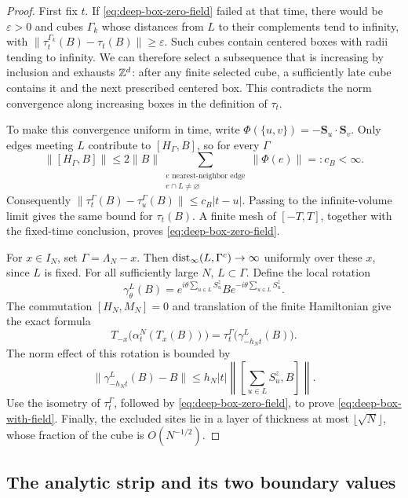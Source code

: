 \begin{proof}
First fix \(t\).  If \eqref{eq:deep-box-zero-field} failed at that
time, there would be \(\varepsilon>0\) and cubes \(\Gamma_k\)
whose distances from \(L\) to their complements tend to infinity,
with
\(\|\tau_t^{\Gamma_k}(B)-\tau_t(B)\|\geq\varepsilon\).
Such cubes contain centered boxes with radii tending to infinity.
We can therefore select a subsequence that is increasing by inclusion
and exhausts \(\mathbb Z^d\): after any finite selected cube, a sufficiently
late cube contains it and the next prescribed centered box.  This
contradicts the norm convergence along increasing boxes in the
definition of \(\tau_t\).

To make this convergence uniform in time, write
\(\Phi(\{u,v\})=-\mathbf S_u\cdot\mathbf S_v\).  Only edges meeting
\(L\) contribute to \([H_\Gamma,B]\), so for every \(\Gamma\)
\[
 \|[H_\Gamma,B]\|\leq
 2\|B\|\sum_{\substack{e\text{ nearest-neighbor edge}\\e\cap L\ne\varnothing}}
                   \|\Phi(e)\|=:c_B<\infty.
\]
Consequently
\(\|\tau_t^\Gamma(B)-\tau_u^\Gamma(B)\|\leq c_B|t-u|\).
Passing to the infinite-volume limit gives the same bound for
\(\tau_t(B)\).  A finite mesh of \([-T,T]\), together with the
fixed-time conclusion, proves \eqref{eq:deep-box-zero-field}.

For \(x\in I_N\), set \(\Gamma=\Lambda_N-x\).  Then
\(\operatorname{dist}_\infty(L,\Gamma^c)\to\infty\) uniformly over these
\(x\), since \(L\) is fixed.  For all sufficiently large \(N\),
\(L\subset\Gamma\).  Define the local rotation
\[
 \gamma_\theta^L(B)
   =e^{i\theta\sum_{u\in L}S_u^z}B
      e^{-i\theta\sum_{u\in L}S_u^z}.
\]
The commutation \([H_N,M_N]=0\) and translation of the finite
Hamiltonian give the exact formula
\begin{equation}\label{eq:field-rotation-sign}
 T_{-x}\bigl(\alpha_t^N(T_x(B))\bigr)
       =\tau_t^\Gamma\bigl(\gamma_{-h_Nt}^L(B)\bigr).
\end{equation}
The norm effect of this rotation is bounded by
\[
 \|\gamma_{-h_Nt}^L(B)-B\|
 \leq h_N|t|\left\|\left[\sum_{u\in L}S_u^z,B\right]\right\|.
\]
Use the isometry of \(\tau_t^\Gamma\), followed by
\eqref{eq:deep-box-zero-field}, to prove
\eqref{eq:deep-box-with-field}.  Finally, the excluded sites lie in
a layer of thickness at most \(\lfloor\sqrt N\rfloor\), whose
fraction of the cube is \(O(N^{-1/2})\).
\end{proof}

\subsection{The analytic strip and its two boundary values}

